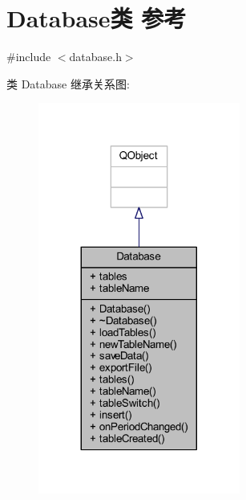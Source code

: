 \hypertarget{class_database}{}\section{Database类 参考}
\label{class_database}


{\ttfamily \#include $<$database.\+h$>$}



类 Database 继承关系图\+:
\nopagebreak
\begin{figure}[H]
\begin{center}
\leavevmode
\includegraphics[width=188pt]{class_database__inherit__graph}
\end{center}
\end{figure}


